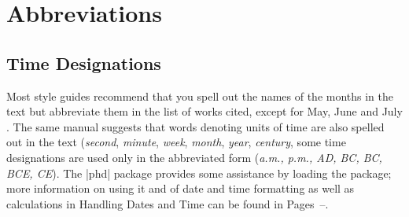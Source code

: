 \section{Abbreviations}

\subsection{Time Designations}

Most style guides recommend that you spell out the names of the months in the text but abbreviate them in the list  of works cited, except for May, June and July \cite{MLA}. The same manual suggests that words denoting units of time are also spelled out in the text (\textit{second}, \textit{minute}, \textit{week}, \textit{month}, \textit{year}, \textit{century}, some time designations are used only in the abbreviated form (\textit{a.m., p.m., AD, BC, BC, BCE, CE}). The |phd| package provides some assistance by loading the  package; more information on using it and of date and time formatting as well as calculations in Handling Dates and Time can be found in Pages~\pageref{ch:dates}--\pageref{datesend}.
\medskip

